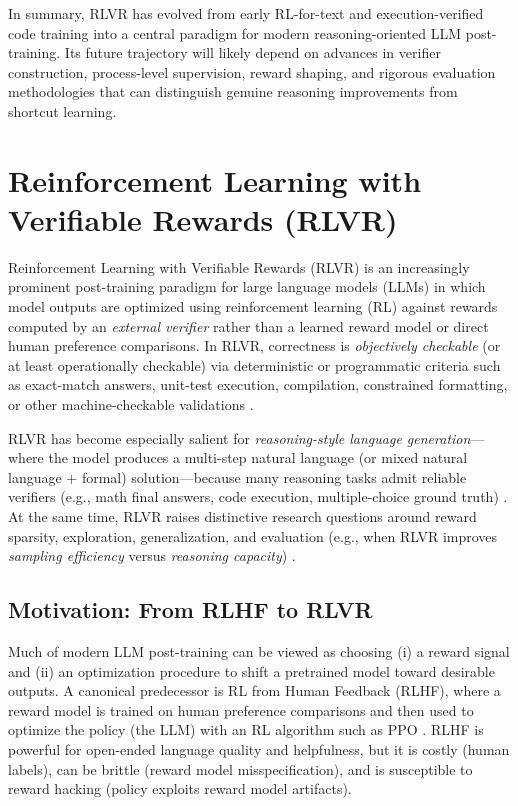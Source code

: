 \documentclass[unnumsec,webpdf,contemporary,large]{oup-authoring-template}
\theoremstyle{thmstyleone}
\theoremstyle{thmstyletwo}
\theoremstyle{thmstylethree}
\begin{document}
In summary, RLVR has evolved from early RL-for-text and execution-verified code training into a central paradigm for modern reasoning-oriented LLM post-training. Its future trajectory will likely depend on advances in verifier construction, process-level supervision, reward shaping, and rigorous evaluation methodologies that can distinguish genuine reasoning improvements from shortcut learning.



\section{Reinforcement Learning with Verifiable Rewards (RLVR)}
\label{sec:rlvr}

Reinforcement Learning with Verifiable Rewards (RLVR) is an increasingly prominent post-training paradigm for large language models (LLMs) in which model outputs are optimized using reinforcement learning (RL) against rewards computed by an \emph{external verifier} rather than a learned reward model or direct human preference comparisons.
In RLVR, correctness is \emph{objectively checkable} (or at least operationally checkable) via deterministic or programmatic criteria such as exact-match answers, unit-test execution, compilation, constrained formatting, or other machine-checkable validations \cite{guo2025deepseekr1,deepseekai2024deepseekmath,wen2025rlvr}.

RLVR has become especially salient for \emph{reasoning-style language generation}---where the model produces a multi-step natural language (or mixed natural language + formal) solution---because many reasoning tasks admit reliable verifiers (e.g., math final answers, code execution, multiple-choice ground truth) \cite{guo2025deepseekr1,wen2025rlvr,zhang2025medrlvr}.
At the same time, RLVR raises distinctive research questions around reward sparsity, exploration, generalization, and evaluation (e.g., when RLVR improves \emph{sampling efficiency} versus \emph{reasoning capacity}) \cite{wen2025rlvr,mroueh2025grpo}.

\subsection{Motivation: From RLHF to RLVR}

Much of modern LLM post-training can be viewed as choosing (i) a reward signal and (ii) an optimization procedure to shift a pretrained model toward desirable outputs.
A canonical predecessor is RL from Human Feedback (RLHF), where a reward model is trained on human preference comparisons and then used to optimize the policy (the LLM) with an RL algorithm such as PPO \cite{christiano2017preferences,ziegler2019finetuning,stiennon2020summarize,ouyang2022instructgpt,schulman2017ppo}.
RLHF is powerful for open-ended language quality and helpfulness, but it is costly (human labels), can be brittle (reward model misspecification), and is susceptible to reward hacking (policy exploits reward model artifacts).
\end{document}
